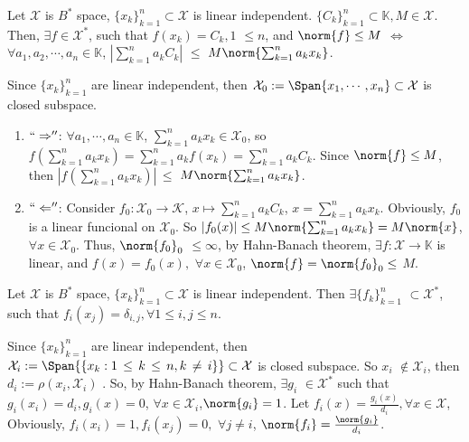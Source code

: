 \documentclass{ctexart}
\begin{document}
\begin{problem}
  Let \(\mathcal{X}\) is \(B^*\) space, \(\{x_k\}_{k=1}^{n} \subset \mathcal{X}\) is linear independent. 
  \(\{C_k\}_{k=1}^{n} \subset \mathbb{K}, M \in \mathcal{X}\). Then, \(\exists f \in \mathcal{X}^*\), such that
  \(f(x_k)=C_k,1\) \(\leq n\), and \(\norm{f} \leq M\) \(\iff\)
  \(\forall a_1,a_2,\cdots,a_n \in \mathbb{K}\), \(|\sum_{k=1}^{n}a_kC_k|\) \(\leq\) \(M \norm{\sum_{k=1}^{n}a_kx_k}\).
\end{problem}
\begin{solution}
  Since \(\{x_k\}_{k=1}^{n}\) are linear independent, 
  then \(\mathcal{X}_0:=\Span\{x_1,\cdots,x_n\} \subset \mathcal{X}\) is closed subspace.
  \begin{enumerate} 
    \item \(``\Rightarrow''\): \(\forall a_1,\cdots,a_n \in \mathbb{K}\), 
      \(\sum_{k=1}^{n} a_kx_k \in \mathcal{X}_0\), so \(f(\sum_{k=1} ^{n} a_kx_k) =\sum_{k=1} ^{n}a_kf(x_k)=\sum_{k=1} ^{n}a_kC_k\).
      Since \(\norm{f}\leq M\), then \(|f(\sum_{k=1} ^{n}a_kx_k)|\,\leq\) \(M \norm{\sum_{k=1} ^na_kx_k}\).
    \item \(``\Leftarrow''\): Consider \(f_0:\mathcal{X}_{0} \to \mathcal{K}\), \(x \mapsto \sum_{k=1} ^na_kC_k\), 
      \(x=\sum_{k=1} ^n a_kx_k\). Obviously, \(f_0\) is a linear funcional on \(\mathcal{X}_0\).
      So \(|f_0(x)|\leq M \norm{\sum_{k=1}^na_kx_k }=M \norm{x}\), \(\forall x \in \mathcal{X}_0\).
      Thus, \(\norm{f_{0}}_0\) \(\leq \infty\), by Hahn-Banach theorem, 
      \(\exists f:\mathcal{X}\to \mathbb{K}\) is linear, and \(f(x)=f_0(x),\) \(\forall x \in \mathcal{X}_0\),
      \(\norm{f}=\norm{f_{0}}_0\leq\) \(M\).

  \end{enumerate}
\end{solution}
\begin{problem}
 Let \(\mathcal{X}\) is \(B^*\) space, \(\{x_k\}_{k=1}^{n} \subset \mathcal{X}\) is linear independent. 
 Then \(\exists \{f_k\}_{k=1}^n\) \(\subset \mathcal{X}^*\), such that
 \(f_i(x_j)=\delta_{i,j}, \forall 1 \leq i,j \leq n\).
\end{problem}
\begin{solution}
  Since \(\{x_k\}_{k=1}^{n}\) are linear independent, 
  then \(\mathcal{X}_i:=\Span\{\{x_k:1\,\leq\,k\,\leq\,n,k\,\neq\,i\}\} \subset \mathcal{X}\) is closed subspace.
  So \(x_i\) \(\notin \mathcal{X}_i\), then \(d_i:=\rho(x_i,\mathcal{X}_i)\) .
  So, by Hahn-Banach theorem, \(\exists g_i\) \(\in \mathcal{X}^*\) such that
  \(g_i(x_i)=d_i,g_i(x)=0\), \(\forall x \in \mathcal{X}_i\),\(\norm{g_i}=1\).
  Let \(f_i(x)=\frac{g_i(x)}{d_i}, \forall x \in \mathcal{X}\), Obviously,
  \(f_i(x_i)=1,f_i(x_j)=0,\) \(\forall j \neq i\), \(\norm{f_i}=\frac{\norm{g_i}}{d_i}\).

\end{solution}
\end{document}
